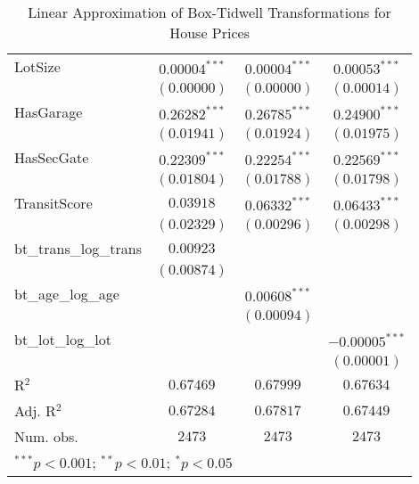 \begin{table}
\begin{center}
\begin{tabular}{l c c c}
LotSize               & $0.00004^{***}$  & $0.00004^{***}$  & $0.00053^{***}$  \\
                      & $(0.00000)$      & $(0.00000)$      & $(0.00014)$      \\
HasGarage             & $0.26282^{***}$  & $0.26785^{***}$  & $0.24900^{***}$  \\
                      & $(0.01941)$      & $(0.01924)$      & $(0.01975)$      \\
HasSecGate            & $0.22309^{***}$  & $0.22254^{***}$  & $0.22569^{***}$  \\
                      & $(0.01804)$      & $(0.01788)$      & $(0.01798)$      \\
TransitScore          & $0.03918$        & $0.06332^{***}$  & $0.06433^{***}$  \\
                      & $(0.02329)$      & $(0.00296)$      & $(0.00298)$      \\
bt\_trans\_log\_trans & $0.00923$        &                  &                  \\
                      & $(0.00874)$      &                  &                  \\
bt\_age\_log\_age     &                  & $0.00608^{***}$  &                  \\
                      &                  & $(0.00094)$      &                  \\
bt\_lot\_log\_lot     &                  &                  & $-0.00005^{***}$ \\
                      &                  &                  & $(0.00001)$      \\
\hline
R$^2$                 & $0.67469$        & $0.67999$        & $0.67634$        \\
Adj. R$^2$            & $0.67284$        & $0.67817$        & $0.67449$        \\
Num. obs.             & $2473$           & $2473$           & $2473$           \\
\hline
\multicolumn{4}{l}{\scriptsize{$^{***}p<0.001$; $^{**}p<0.01$; $^{*}p<0.05$}}
\end{tabular}
\caption{Linear Approximation of Box-Tidwell Transformations for House Prices}
\label{tab:reg_bt_lin}
\end{center}
\end{table}
